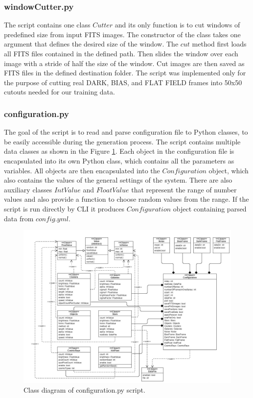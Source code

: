 \subsubsection{windowCutter.py}
The script contains one class $Cutter$ and its only function is to cut windows of predefined size from input FITS images. The constructor of the class takes one argument that defines the desired size of the window. The $cut$ method first loads all FITS files contained in the defined path. Then slides the window over each image with a stride of half the size of the window. Cut images are then saved as FITS files in the defined destination folder. The script was implemented only for the purpose of cutting real DARK, BIAS, and FLAT FIELD frames into 50x50 cutouts needed for our training data. 

\subsubsection{configuration.py}
The goal of the script is to read and parse configuration file to Python classes, to be easily accessible during the generation process. The script contains multiple data classes as shown in the Figure  \ref{img:configurationClass}. Each object in the configuration file is encapsulated into its own Python class, which contains all the parameters as variables. All objects are then encapsulated into the $Configuration$ object, which also contains the values of the general settings of the system. There are also auxiliary classes $IntValue$ and $FloatValue$ that represent the range of number values and also provide a function to choose random values from the range. If the script is run directly by CLI it produces $Configuration$ object containing parsed data from $config.yml$.

\begin{figure}[h]
    \centering
    \includegraphics[width=.9\textwidth]{images/configuration.jpg}
    \caption{Class diagram of configuration.py script.}
    \label{img:configurationClass}
\end{figure}


